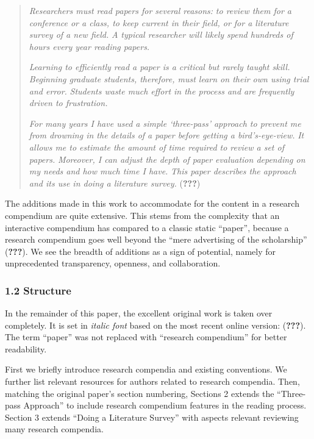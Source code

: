 \documentclass[twocolumn]{article}
\begin{document}
\begin{quote}
\emph{Researchers must read papers for several reasons:} \emph{to review
them for a conference or a class, to keep current in their field, or for
a literature survey of a new field.} \emph{A typical researcher will
likely spend hundreds of hours every year reading papers.}

\emph{Learning to efficiently read a paper is a critical but rarely
taught skill.} \emph{Beginning graduate students, therefore, must learn
on their own using trial and error.} \emph{Students waste much effort in
the process and are frequently driven to frustration.}

\emph{For many years I have used a simple `three-pass' approach to
prevent me from drowning in the details of a paper before getting a
bird's-eye-view.} \emph{It allows me to estimate the amount of time
required to review a set of papers.} \emph{Moreover, I can adjust the
depth of paper evaluation depending on my needs and how much time I
have.} \emph{This paper describes the approach and its use in doing a
literature survey.} ({\textbf{???}})
\end{quote}

The additions made in this work to accommodate for the content in a
research compendium are quite extensive. This stems from the complexity
that an interactive compendium has compared to a classic static
``paper'', because a research compendium goes well beyond the ``mere
advertising of the scholarship'' ({\textbf{???}}). We see the breadth of
additions as a sign of potential, namely for unprecedented transparency,
openness, and collaboration.

\hypertarget{structure}{%
\subsubsection*{1.2 Structure}\label{structure}}

In the remainder of this paper, the excellent original work is taken
over completely. It is set in \emph{italic font} based on the most
recent online version: ({\textbf{???}}). The term ``paper'' was not
replaced with ``research compendium'' for better readability.

First we briefly introduce research compendia and existing conventions.
We further list relevant resources for authors related to research
compendia. Then, matching the original paper's section numbering,
Sections 2 extends the ``Three-pass Approach'' to include research
compendium features in the reading process. Section 3 extends ``Doing a
Literature Survey'' with aspects relevant reviewing many research
compendia.
\end{document}
